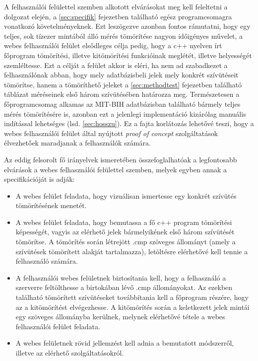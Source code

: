 \documentclass[oneside,titlepage,12pt,a4paper]{report}
\begin{document}
A felhasználói felülettel szemben alkotott elvárásokat meg kell feleltetni a dolgozat elején, a \ref{sec:specifik} fejezetben található egész programcsomagra vonatkozó követelményeknek. Ezt leszögezve azonban fontos rámutatni, hogy egy teljes, sok tízezer mintából álló mérés tömörítése nagyon időigényes művelet, a webes felhasználói felület elsődleges célja pedig, hogy a c++ nyelven írt főprogram tömörítési, illetve kitömörítési funkcióinak meglétét, illetve helyességét szemléltesse. Ezt a célját a felület akkor is eléri, ha nem ad szabadkezet a felhasználónak abban, hogy mely adatbázisbeli jelek mely konkrét szívütéseit tömörítse, hanem a tömöríthető jeleket a \ref{sec:methodtest} fejezetben található táblázat méréseinek első három szívütésében határozza meg. Természetesen a főprogramcsomag alkamas az MIT-BIH adatbázisban található bármely teljes mérés tömörítésére is, azonban ezt a jelenlegi implementáció kizárólag manuális indítással lehetséges (lsd. \ref{sec:hosszu}). Ez a fajta korlátozás lehetővé teszi, hogy a webes felhasználói felület által nyújtott \textit{proof of concept} szolgáltatások élvezhetőek maradjanak a felhasználók számára. 
\par Az eddig felsorolt fő irányelvek ismeretében összefoglalhatóak a legfontosabb elvárások a webes felhasználói felülettel szemben, melyek egyben annak a specifikációját is adják:
\begin{itemize}
  \item A webes felület feladata, hogy vizuálisan ismertesse egy konkrét szívütés tömörítésének menetét.
  \item A webes felület feladata, hogy bemutassa a fő c++ program tömörítési képességét, vagyis az elérhető jelek bármelyikének első három szívütését tömörítse. A tömörítés során létrejött .cmp szöveges állományt (amely a szívütések tömörített alakját tartalmazza), letöltésre elérhetővé kell tennie a felhasználó számára. 
  \item A felhasználói webes felületnek biztosítania kell, hogy a felhasználó a szerverre feltölthesse a birtokában lévő .cmp állományokat. Az ezekben található tömörített szívütéseket továbbítania kell a főprogram részére, hogy az a kitömörítést elvégezhesse. A kitömörítés során a keletkezett jelek mintái egy szöveges állományba kerülnek, melynek elérhetővé tétele a webes felhasználói felület feladata.
  \item A webes felületnek rövid jellemzést kell adnia a bemutatott módszerről, illetve az elérhető szolgáltatásokról. 
\end{itemize}
   
\end{document}
